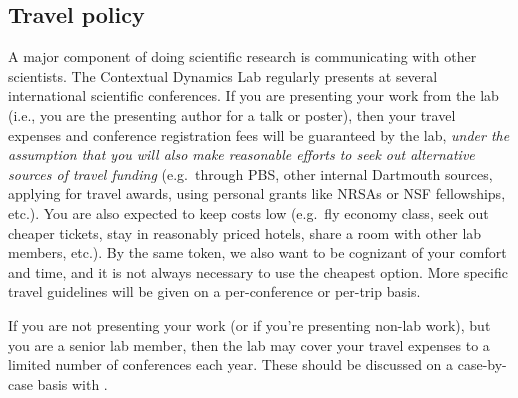 \documentclass{tufte-book} %
\begin{document}
 \subsection{Travel policy}
 A major component of doing scientific
 research is communicating with other scientists.  The Contextual
 Dynamics Lab regularly presents at several international scientific
 conferences.  If you are presenting your work from the lab (i.e., you
 are the presenting author for a talk or poster), then your travel
 expenses and conference registration fees will be guaranteed by the
 lab, \textit{under the assumption that you will also make reasonable
   efforts to seek out alternative sources of travel funding} (e.g.\
 through PBS, other internal Dartmouth sources, applying for travel
 awards, using personal grants like NRSAs or NSF fellowships, etc.).
 You are also expected to keep costs low (e.g.\ fly economy class,
 seek out cheaper tickets, stay in reasonably priced hotels, share a
 room with other lab members, etc.).  By the same token, we also want
 to be cognizant of your comfort and time, and it is not always
 necessary to use the cheapest option.  More specific travel
 guidelines will be given on a per-conference or per-trip basis.

 If you are not presenting your work (or if you're presenting non-lab
 work), but you are a senior lab member, then the lab may cover your
 travel expenses to a limited number of conferences each year.  These
 should be discussed on a case-by-case basis with \director.
\end{document}
